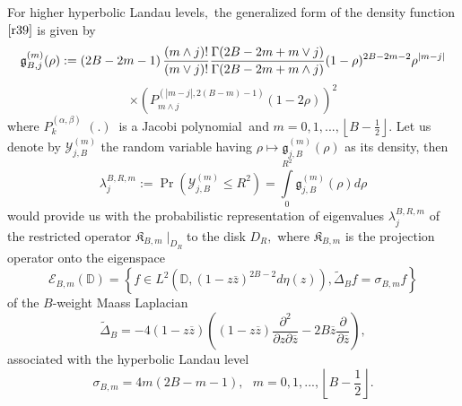 For higher hyperbolic Landau levels$,$ the generalized form of the density
function $\eqref{r39}$ is given by 
\begin{equation}
\label{r41}
\mathfrak{g}_{B,j}^{\left( m\right) }(\rho ):=\left( 2B-2m-1\right) \frac{%
\left( m\wedge j\right) !}{\left( m\vee j\right) !}\frac{\Gamma (2B-2m+m\vee
j)}{\Gamma (2B-2m+m\wedge j)}(1-\rho )^{2B-2m-2}\rho ^{\left\vert
m-j\right\vert }  
\end{equation}
\begin{equation*}
\times \left( P_{m\wedge j}^{\left( \left\vert m-j\right\vert ,2\left(
B-m\right) -1\right) }\left( 1-2\rho \right) \right) ^{2}
\end{equation*}%
where $P_{k}^{\left( \alpha ,\beta \right) }$ $\left( .\right) $ $\ $is a
Jacobi polynomial \cite{MaOb} $\ $and $m=0,1,...,\left\lfloor B-%
{\frac12}%
\right\rfloor .$ Let us denote by $\mathcal{Y}_{j,B}^{\left( m\right) }$ the
random variable having $\rho \mapsto \mathfrak{g}_{j,B}^{\left( m\right)
}(\rho )$ as its density, then 
\begin{equation}
\label{r42}
\lambda _{j}^{B,R,m}:=\Pr \left( \mathcal{Y}_{j,B}^{\left( m\right) }\leq
R^{2}\right) =\int\limits_{0}^{R^{2}}\mathfrak{g}_{j,B}^{\left( m\right)
}(\rho )d\rho   
\end{equation}
would provide us with the probabilistic representation of eigenvalues $%
\lambda _{j}^{B,R,m}$ of the restricted operator $\mathfrak{K}_{B,m}\mid
_{D_{R}}$to the disk $D_{R},$ where $\mathfrak{K}_{B,m}$ is the projection
operator onto the eigenspace
\begin{equation}
\label{r43}
\mathcal{E}_{B,m}\left( \mathbb{D}\right) =\left\{ f\in L^{2}\left( \mathbb{D%
},\left( 1-z\overline{z}\right) ^{2B-2}d\eta \left( z\right) \right) ,%
\widetilde{\Delta }_{B}f=\sigma _{B,m}f\right\}   
\end{equation}
of the $B$-weight Maass Laplacian 
\begin{equation}
\label{r44}
\widetilde{\Delta }_{B}=-4\left( 1-z\overline{z}\right) \left( \left( 1-z%
\overline{z}\right) \frac{\partial ^{2}}{\partial z\partial \overline{z}}-2B%
\overline{z}\frac{\partial }{\partial \overline{z}}\right) ,  
\end{equation}
associated with the hyperbolic Landau level%
\begin{equation}
\label{r45}
\sigma _{B,m}=4m\left( 2B-m-1\right) ,\text{ \ \ }m=0,1,...,\left\lfloor B-%
{\frac12}%
\right\rfloor .  
\end{equation}
